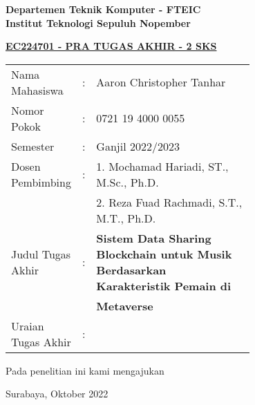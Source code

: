 \begin{flushleft}
  \textbf{Departemen Teknik Komputer - FTEIC}\\
  \textbf{Institut Teknologi Sepuluh Nopember}\\
\end{flushleft}

\begin{center}
  \underline{\textbf{EC224701 - PRA TUGAS AKHIR - 2 SKS}}
\end{center}

\begin{adjustwidth}{-0.2cm}{}
  \begin{tabular}{lcp{0.7\linewidth}}

    Nama Mahasiswa &:& Aaron Christopher Tanhar \\
    Nomor Pokok &:& 0721 19 4000 0055 \\

    Semester &:& Ganjil 2022/2023 \\

    Dosen Pembimbing &:& 1. Mochamad Hariadi, ST., M.Sc., Ph.D. \\
    & & 2. Reza Fuad Rachmadi, S.T., M.T., Ph.D. \\

    Judul Tugas Akhir &:& \textbf{Sistem Data Sharing Blockchain untuk Musik Berdasarkan Karakteristik Pemain di} \\
    & & \textbf{Metaverse} \\

    Uraian Tugas Akhir &:& \\
  \end{tabular}
\end{adjustwidth}

Pada penelitian ini kami mengajukan \lipsum[1][1-10]
\vspace{1ex}

\begin{flushright}
  Surabaya, Oktober 2022
\end{flushright}
\vspace{1ex}

